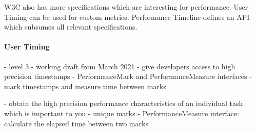 




















W3C also has more specifications which are interesting for performance.
User Timing can be used for custom metrics.
Performance Timeline defines an API which subsumes all relevant specifications.


\paragraph{User Timing}


- level 3
- working draft from March 2021
- give developers access to high precision timestamps
- PerformanceMark and PerformanceMeasure interfaces
- mark timestamps and measure time between marks


-  obtain the high precision performance characteristics of an individual task which is important to you
- unique marks
- PerformanceMeasure interface: calculate the elapsed time between two marks



